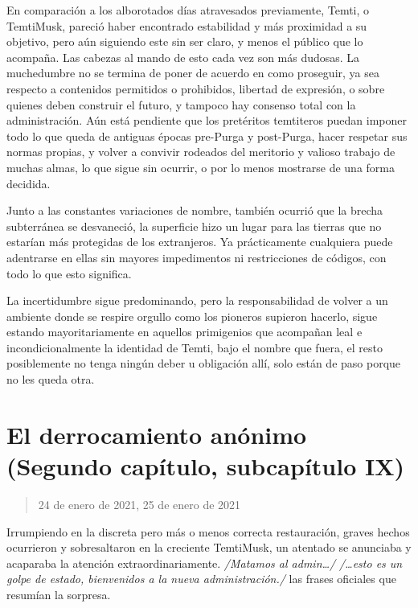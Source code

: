 \documentclass[
  spanish,
]{book}
\begin{document}
En comparación a los alborotados días atravesados previamente, Temti, o TemtiMusk, pareció haber encontrado estabilidad y más proximidad a su objetivo, pero aún siguiendo este sin ser claro, y menos el público que lo acompaña. Las cabezas al mando de esto cada vez son más dudosas. La muchedumbre no se termina de poner de acuerdo en como proseguir, ya sea respecto a contenidos permitidos o prohibidos, libertad de expresión, o sobre quienes deben construir el futuro, y tampoco hay consenso total con la administración. Aún está pendiente que los pretéritos temtiteros puedan imponer todo lo que queda de antiguas épocas pre-Purga y post-Purga, hacer respetar sus normas propias, y volver a convivir rodeados del meritorio y valioso trabajo de muchas almas, lo que sigue sin ocurrir, o por lo menos mostrarse de una forma decidida.

Junto a las constantes variaciones de nombre, también ocurrió que la brecha subterránea se desvaneció, la superficie hizo un lugar para las tierras que no estarían más protegidas de los extranjeros. Ya prácticamente cualquiera puede adentrarse en ellas sin mayores impedimentos ni restricciones de códigos, con todo lo que esto significa.

La incertidumbre sigue predominando, pero la responsabilidad de volver a un ambiente donde se respire orgullo como los pioneros supieron hacerlo, sigue estando mayoritariamente en aquellos primigenios que acompañan leal e incondicionalmente la identidad de Temti, bajo el nombre que fuera, el resto posiblemente no tenga ningún deber u obligación allí, solo están de paso porque no les queda otra.

\hypertarget{el-derrocamiento-anuxf3nimo-segundo-capuxedtulo-subcapuxedtulo-ix}{%
\section{El derrocamiento anónimo (Segundo capítulo, subcapítulo IX)}\label{el-derrocamiento-anuxf3nimo-segundo-capuxedtulo-subcapuxedtulo-ix}}

\begin{quote}
24 de enero de 2021, 25 de enero de 2021
\end{quote}

Irrumpiendo en la discreta pero más o menos correcta restauración, graves hechos ocurrieron y sobresaltaron en la creciente TemtiMusk, un atentado se anunciaba y acaparaba la atención extraordinariamente. \emph{/Matamos al admin\ldots/} \emph{/\ldots esto es un golpe de estado, bienvenidos a la nueva administración./} las frases oficiales que resumían la sorpresa.
\end{document}
